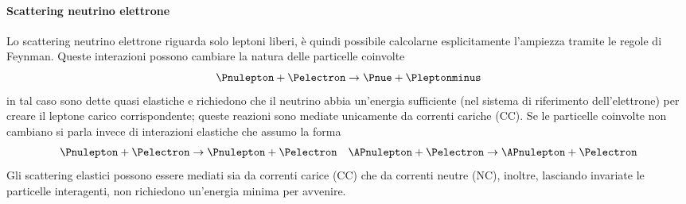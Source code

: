 \documentclass[../../main.tex]{subfiles}
\begin{document}
  \paragraph{Scattering neutrino elettrone}
    Lo scattering neutrino elettrone riguarda solo leptoni liberi, è quindi
    possibile calcolarne esplicitamente l'ampiezza tramite le regole di Feynman.
    Queste interazioni possono cambiare la natura delle particelle coinvolte
    \begin{equation*}
      \Pnulepton + \Pelectron \rightarrow \Pnue + \Pleptonminus
    \end{equation*}
    in tal caso sono dette quasi elastiche e richiedono che il neutrino abbia
    un'energia sufficiente (nel sistema di riferimento dell'elettrone) per
    creare il leptone carico corrispondente; queste reazioni sono mediate
    unicamente da correnti cariche (CC).
    Se le particelle coinvolte non cambiano si parla invece di interazioni
    elastiche che assumo la forma
    \begin{align*}
      \Pnulepton + \Pelectron \rightarrow \Pnulepton + \Pelectron &&
      \APnulepton + \Pelectron \rightarrow \APnulepton + \Pelectron
    \end{align*}
    Gli scattering elastici possono essere mediati sia da correnti carice (CC)
    che da correnti neutre (NC), inoltre, lasciando invariate le particelle
    interagenti, non richiedono un'energia minima per avvenire.
\end{document}
